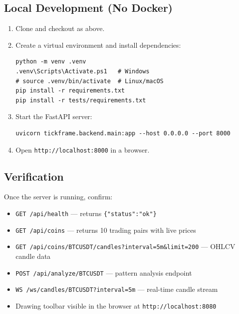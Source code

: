 \documentclass[11pt,a4paper]{article}
\begin{document}
\subsection{Local Development (No Docker)}

\begin{enumerate}[leftmargin=*]
    \item Clone and checkout as above.
    \item Create a virtual environment and install dependencies:
\begin{verbatim}
python -m venv .venv
.venv\Scripts\Activate.ps1   # Windows
# source .venv/bin/activate  # Linux/macOS
pip install -r requirements.txt
pip install -r tests/requirements.txt
\end{verbatim}

    \item Start the FastAPI server:
\begin{verbatim}
uvicorn tickframe.backend.main:app --host 0.0.0.0 --port 8000
\end{verbatim}

    \item Open \texttt{http://localhost:8000} in a browser.
\end{enumerate}

\subsection{Verification}

Once the server is running, confirm:

\begin{itemize}
    \item \texttt{GET /api/health} --- returns \texttt{\{"status":"ok"\}}
    \item \texttt{GET /api/coins} --- returns 10 trading pairs with live prices
    \item \texttt{GET /api/coins/BTCUSDT/candles?interval=5m\&limit=200} --- OHLCV candle data
    \item \texttt{POST /api/analyze/BTCUSDT} --- pattern analysis endpoint
    \item \texttt{WS /ws/candles/BTCUSDT?interval=5m} --- real-time candle stream
    \item Drawing toolbar visible in the browser at \texttt{http://localhost:8080}
\end{itemize}

\end{document}
